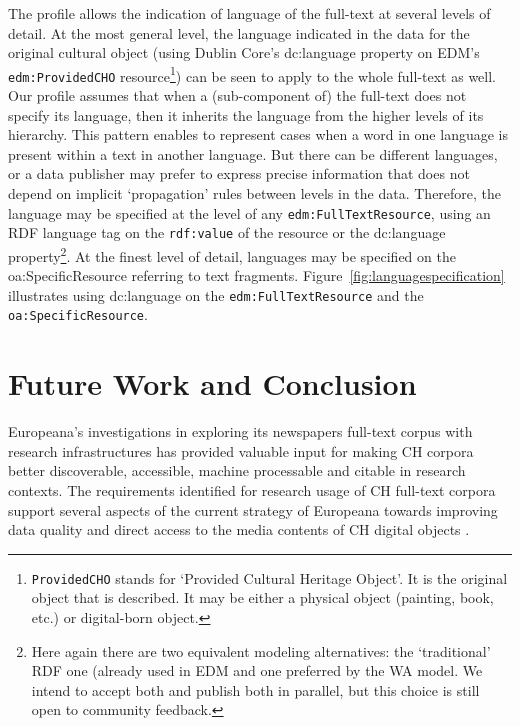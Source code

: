 \documentclass[a4paper,UKenglish,cleveref, autoref]{oasics-v2019}
\begin{document}
The profile allows the indication of language of the full-text at several levels of detail. At the most general level, the language indicated in the data for the original cultural object (using Dublin Core's dc:language property on EDM's \verb+edm:ProvidedCHO+
resource\footnote{\verb+ProvidedCHO+ stands for `Provided Cultural Heritage Object'. It is the original object that is described. It may be either a physical object (painting, book, etc.) or digital-born object.})
can be seen to apply to the whole full-text as well. Our profile assumes that when a (sub-component of) the full-text does not specify its language, then it inherits the language from the higher levels of its hierarchy. This pattern enables to represent cases when a word in one language is present within a text in another language. But there can be different languages, or a data publisher may prefer to express precise information that does not depend on implicit `propagation' rules between levels in the data. Therefore, the language may be specified at the level of any \verb+edm:FullTextResource+, using an RDF language tag on the \verb+rdf:value+ of the resource or the dc:language property\footnote{Here again there are two equivalent modeling alternatives: the `traditional’ RDF one (already used in EDM and one preferred by the WA model. We intend to accept both and publish both in parallel, but this choice is still open to community feedback.}.
At the finest level of detail, languages may be specified on the oa:SpecificResource referring to text fragments. Figure~\ref{fig:languagespecification} illustrates using dc:language on the \verb+edm:FullTextResource+ and the \verb+oa:SpecificResource+.

\section{Future Work and Conclusion}
\label{sec:conclusion}

Europeana's investigations in exploring its newspapers full-text corpus with research infrastructures has provided valuable input for making CH corpora better discoverable, accessible, machine processable and citable in research contexts. The requirements identified for research usage of CH full-text corpora support several aspects of the current strategy of Europeana towards improving data quality and direct access to the media contents of CH digital objects \cite{publishingGuide}. 
\end{document}
